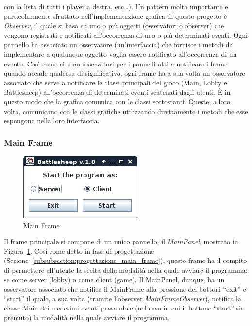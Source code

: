 con la lista di tutti i player a destra, ecc\dots).\newline
Un pattern molto importante e particolarmente sfruttato nell'implementazione
grafica di questo progetto è \textit{Observer}, il quale si basa su uno o più
oggetti (osservatori o observer) che vengono registrati e notificati
all'occorrenza di uno o più determinati eventi. Ogni pannello ha associato un
osservatore (un'interfaccia) che fornisce i metodi da implementare a qualunque
oggetto voglia essere notificato all'occorrenza di un evento. Così come ci sono
osservatori per i pannelli atti a notificare i frame quando accade qualcosa di
significativo, ogni frame ha a sua volta un osservatore associato che serve a
notificare le classi principali del gioco (Main, Lobby e Battlesheep)
all'occorrenza di determinati eventi scatenati dagli utenti. È in questo modo
che la grafica comunica con le classi sottostanti. Queste, a loro volta,
comunicano con le classi grafiche utilizzando direttamente i metodi che esse
espongono nella loro interfaccia.



\subsubsection{Main Frame}
\begin{figure}[!h]
	\centering
	\includegraphics[scale=0.5]{core/imgs/gui/main_frame}
	\caption{Main Frame}
	\label{figure:main_frame}
\end{figure}
Il frame principale si compone di un unico pannello, il \textit{MainPanel},
mostrato in Figura~\ref{figure:main_frame}. Così come detto in fase di
progettazione (Sezione~\ref{subsubsection:progettazione_main_frame}), questo
frame ha il compito di permettere all'utente la scelta della modalità nella
quale avviare il programma: se come server (lobby) o come client (game).\newline
Il MainPanel, dunque, ha un osservatore associato che notifica il MainFrame alla
pressione dei bottoni ``exit'' e ``start'' il quale, a sua volta (tramite
l'observer \textit{MainFrameObserver}), notifica la classe Main dei medesimi
eventi passandole (nel caso in cui il bottone ``start'' sia premuto) la modalità
nella quale avviare il programma.



